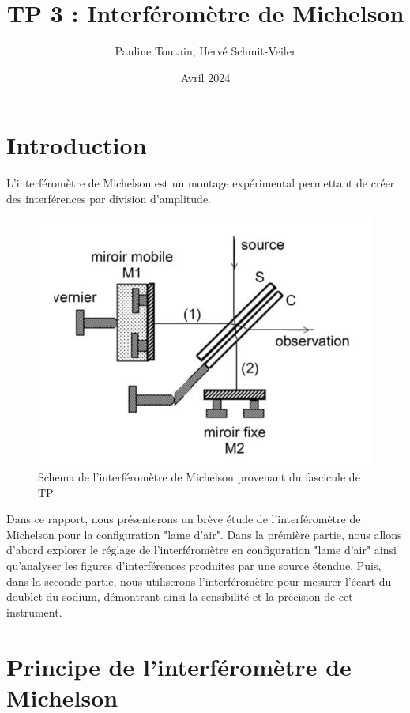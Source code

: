 \documentclass{article}
\title{\textbf{TP 3 : Interféromètre de Michelson}}
\author{Pauline Toutain, Hervé Schmit-Veiler}
\date{Avril 2024}
\begin{document}
\maketitle

\section{Introduction}

L'interféromètre de Michelson est un montage expérimental permettant de créer des interférences 
par division d'amplitude.

\begin{figure}[H]
    \centering
    \includegraphics[width=0.5\linewidth]{figs/michelson.png}
    \caption{Schema de l'interféromètre de Michelson provenant du fascicule de TP}
    \label{fig:michelson}
\end{figure}


Dans ce rapport, nous présenterons un brève étude de l'interféromètre de Michelson pour la configuration 
"lame d'air". Dans la prémière partie, nous allons d'abord explorer le réglage de l'interféromètre en configuration "lame d'air" ainsi qu'analyser
les figures d'interférences produites par une source étendue. Puis, dans la seconde partie, nous 
utiliserons l'interféromètre pour mesurer l'écart du doublet du sodium, démontrant ainsi la sensibilité et 
la précision de cet instrument. 

\section{Principe de l'interféromètre de Michelson}
\end{document}
